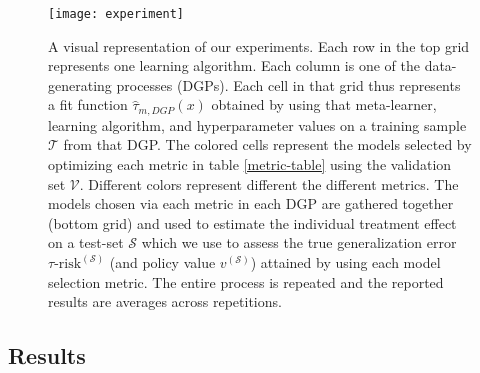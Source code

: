 \begin{figure}
  \centering
    \texttt{[image: experiment]}
      \caption{A visual representation of our experiments. Each row in the top grid represents one learning algorithm. Each column is one of the data-generating processes (DGPs). Each cell in that grid thus represents a fit function $\hat\tau_{m,DGP}(x)$ obtained by using that meta-learner, learning algorithm, and hyperparameter values on a training sample $\mathcal T$ from that DGP. The colored cells represent the models selected by optimizing each metric in table \ref{metric-table} using the validation set $\mathcal V$. Different colors represent different the different metrics. The models chosen via each metric in each DGP are gathered together (bottom grid) and used to estimate the individual treatment effect on a test-set $\mathcal S$ which we use to assess the true generalization error $\tau\text{-risk}^{(\mathcal S)}$ (and policy value $v^{(\mathcal S)}$) attained by using each model selection metric. The entire process is repeated and the reported results are averages across repetitions.}
      \label{experiment-fig}
\end{figure}

\subsection{Results}

